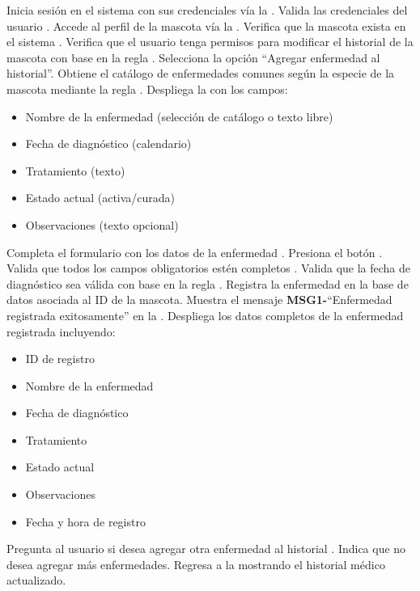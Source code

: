 \begin{UCtrayectoria}
	\UCpaso[\UCactor] Inicia sesión en el sistema con sus credenciales vía la  \label{CU18Login}.
	\UCpaso Valida las credenciales del usuario .
	\UCpaso[\UCactor] Accede al perfil de la mascota vía la .
	\UCpaso Verifica que la mascota exista en el sistema .
	\UCpaso Verifica que el usuario tenga permisos para modificar el historial de la mascota  	con base en la regla  .
	\UCpaso[\UCactor] Selecciona la opción ``Agregar enfermedad al historial''.
	\UCpaso Obtiene el catálogo de enfermedades comunes según la especie de la mascota  	mediante la regla .
	\UCpaso Despliega la  con los campos: 		\begin{itemize} 			\item Nombre de la enfermedad (selección de catálogo o texto libre) 			\item Fecha de diagnóstico (calendario) 			\item Tratamiento (texto) 			\item Estado actual (activa/curada) 			\item Observaciones (texto opcional) 		\end{itemize}
	\UCpaso[\UCactor] Completa el formulario con los datos de la enfermedad \label{CU18CompletarDatos}.
	\UCpaso[\UCactor] Presiona el botón .
	\UCpaso Valida que todos los campos obligatorios estén completos .
	\UCpaso Valida que la fecha de diagnóstico sea válida con base en la regla 
	 .
	\UCpaso Registra la enfermedad en la base de datos asociada al ID de la mascota.
	\UCpaso Muestra el mensaje {\bf MSG1-}``Enfermedad registrada exitosamente'' en la 
	.
	\UCpaso Despliega los datos completos de la enfermedad registrada incluyendo: 		\begin{itemize} 			\item ID de registro 			\item Nombre de la enfermedad 			\item Fecha de diagnóstico 			\item Tratamiento 			\item Estado actual 			\item Observaciones 			\item Fecha y hora de registro 		\end{itemize}
	\UCpaso Pregunta al usuario si desea agregar otra enfermedad al historial .
	\UCpaso[\UCactor] Indica que no desea agregar más enfermedades.
	\UCpaso Regresa a la  mostrando el historial  	médico actualizado.
\end{UCtrayectoria}

